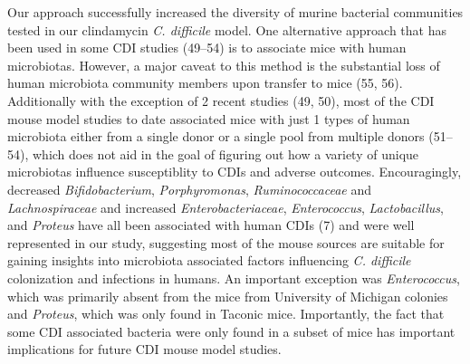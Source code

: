 \documentclass[11pt,]{article}
\begin{document}
Our approach successfully increased the diversity of murine bacterial
communities tested in our clindamycin \emph{C. difficile} model. One
alternative approach that has been used in some CDI studies (49--54) is
to associate mice with human microbiotas. However, a major caveat to
this method is the substantial loss of human microbiota community
members upon transfer to mice (55, 56). Additionally with the exception
of 2 recent studies (49, 50), most of the CDI mouse model studies to
date associated mice with just 1 types of human microbiota either from a
single donor or a single pool from multiple donors (51--54), which does
not aid in the goal of figuring out how a variety of unique microbiotas
influence susceptiblity to CDIs and adverse outcomes. Encouragingly,
decreased \emph{Bifidobacterium}, \emph{Porphyromonas},
\emph{Ruminococcaceae} and \emph{Lachnospiraceae} and increased
\emph{Enterobacteriaceae}, \emph{Enterococcus}, \emph{Lactobacillus},
and \emph{Proteus} have all been associated with human CDIs (7) and were
well represented in our study, suggesting most of the mouse sources are
suitable for gaining insights into microbiota associated factors
influencing \emph{C. difficile} colonization and infections in humans.
An important exception was \emph{Enterococcus}, which was primarily
absent from the mice from University of Michigan colonies and
\emph{Proteus}, which was only found in Taconic mice. Importantly, the
fact that some CDI associated bacteria were only found in a subset of
mice has important implications for future CDI mouse model studies.
\end{document}

